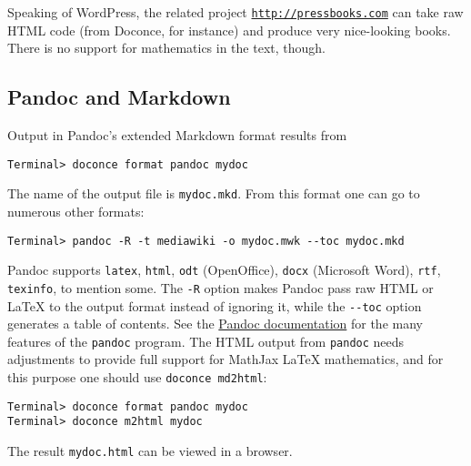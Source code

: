 \documentclass[%
oneside,                 %
final,                   %
10pt]{article}
\begin{document}
Speaking of WordPress, the related project \href{{http://pressbooks.com}}{\nolinkurl{http://pressbooks.com}} can take raw HTML code (from Doconce, for
instance) and produce very nice-looking books.  There is no support
for mathematics in the text, though.

\subsection{Pandoc and Markdown}

Output in Pandoc's extended Markdown format results from
\vspace{4pt}
\begin{Verbatim}[numbers=none,frame=lines,fontsize=\fontsize{9pt}{9pt},labelposition=topline,framesep=2.5mm,framerule=0.7pt]
Terminal> doconce format pandoc mydoc
\end{Verbatim}
The name of the output file is {\fontsize{10pt}{10pt}\Verb!mydoc.mkd!}.
From this format one can go to numerous other formats:
\vspace{4pt}
\begin{Verbatim}[numbers=none,frame=lines,fontsize=\fontsize{9pt}{9pt},labelposition=topline,framesep=2.5mm,framerule=0.7pt]
Terminal> pandoc -R -t mediawiki -o mydoc.mwk --toc mydoc.mkd
\end{Verbatim}
Pandoc supports {\fontsize{10pt}{10pt}\Verb!latex!}, {\fontsize{10pt}{10pt}\Verb!html!}, {\fontsize{10pt}{10pt}\Verb!odt!} (OpenOffice), {\fontsize{10pt}{10pt}\Verb!docx!} (Microsoft
Word), {\fontsize{10pt}{10pt}\Verb!rtf!}, {\fontsize{10pt}{10pt}\Verb!texinfo!}, to mention some. The {\fontsize{10pt}{10pt}\Verb!-R!} option makes
Pandoc pass raw HTML or {\LaTeX} to the output format instead of ignoring it,
while the {\fontsize{10pt}{10pt}\Verb!--toc!} option generates a table of contents.
See the \href{{http://johnmacfarlane.net/pandoc/README.html}}{Pandoc documentation}
for the many features of the {\fontsize{10pt}{10pt}\Verb!pandoc!} program. The HTML output from
{\fontsize{10pt}{10pt}\Verb!pandoc!} needs adjustments to provide full support for MathJax {\LaTeX}
mathematics, and for this purpose one should use {\fontsize{10pt}{10pt}\Verb!doconce md2html!}:

\vspace{4pt}
\begin{Verbatim}[numbers=none,frame=lines,fontsize=\fontsize{9pt}{9pt},labelposition=topline,framesep=2.5mm,framerule=0.7pt]
Terminal> doconce format pandoc mydoc
Terminal> doconce m2html mydoc
\end{Verbatim}
The result {\fontsize{10pt}{10pt}\Verb!mydoc.html!} can be viewed in a browser.
\end{document}
